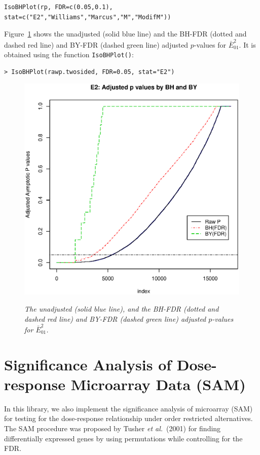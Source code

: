 \begin{center}
\begin{boxit}
\begin{verbatim}
IsoBHPlot(rp, FDR=c(0.05,0.1),
stat=c("E2","Williams","Marcus","M","ModifM"))
\end{verbatim}
\end{boxit}
\end{center}
Figure~\ref{IsoBHPlot} shows the unadjusted (solid blue line) and
the BH-FDR (dotted and dashed red line) and BY-FDR (dashed green
line) adjusted $p$-values for $\bar{E}^2_{01}$. It is obtained using
the function \texttt{IsoBHPlot()}:
\begin{center}
\begin{boxit}
\begin{verbatim}
> IsoBHPlot(rawp.twosided, FDR=0.05, stat="E2")
\end{verbatim}
\end{boxit}
\end{center}


\begin{figure}[!h]
\centering
{\includegraphics[width=.6\textwidth]{BHPlot1.eps}}
\caption{\em {The unadjusted (solid blue line), and the BH-FDR
(dotted and dashed red line) and BY-FDR (dashed green line) adjusted
$p$-values for $\bar{E}_{01}^2$.}} \label{IsoBHPlot}
\end{figure}



\section{Significance Analysis of Dose-response Microarray Data (SAM)}
In this library, we also implement the significance analysis of microarray (SAM) for testing
for the dose-response relationship under order restricted alternatives. The SAM procedure was proposed
by Tusher \textit{et al.}\ (2001) for finding differentially expressed genes by using permutations while controlling for
the FDR.

